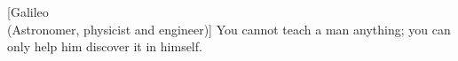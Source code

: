 
%

\begin{ntquote}[8cm]

[Galileo\\\footnotesize(Astronomer, physicist and engineer)]{%
  You cannot teach a man anything; you can only help him discover it in himself.%
}

\end{ntquote}